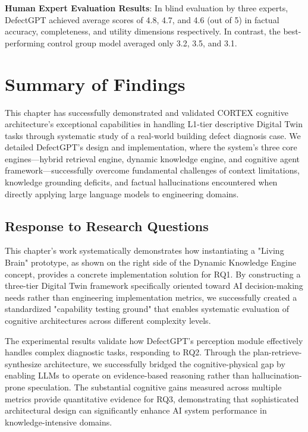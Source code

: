 \textbf{Human Expert Evaluation Results}: In blind evaluation by three experts, DefectGPT achieved average scores of 4.8, 4.7, and 4.6 (out of 5) in factual accuracy, completeness, and utility dimensions respectively. In contrast, the best-performing control group model averaged only 3.2, 3.5, and 3.1.


\section{Summary of Findings}

This chapter has successfully demonstrated and validated CORTEX cognitive architecture's exceptional capabilities in handling L1-tier descriptive Digital Twin tasks through systematic study of a real-world building defect diagnosis case. We detailed DefectGPT's design and implementation, where the system's three core engines—hybrid retrieval engine, dynamic knowledge engine, and cognitive agent framework—successfully overcome fundamental challenges of context limitations, knowledge grounding deficits, and factual hallucinations encountered when directly applying large language models to engineering domains.

\subsection{Response to Research Questions}

This chapter's work systematically demonstrates how instantiating a "Living Brain" prototype, as shown on the right side of the Dynamic Knowledge Engine concept, provides a concrete implementation solution for RQ1. By constructing a three-tier Digital Twin framework specifically oriented toward AI decision-making needs rather than engineering implementation metrics, we successfully created a standardized "capability testing ground" that enables systematic evaluation of cognitive architectures across different complexity levels.

The experimental results validate how DefectGPT's perception module effectively handles complex diagnostic tasks, responding to RQ2. Through the plan-retrieve-synthesize architecture, we successfully bridged the cognitive-physical gap by enabling LLMs to operate on evidence-based reasoning rather than hallucination-prone speculation. The substantial cognitive gains measured across multiple metrics provide quantitative evidence for RQ3, demonstrating that sophisticated architectural design can significantly enhance AI system performance in knowledge-intensive domains.

